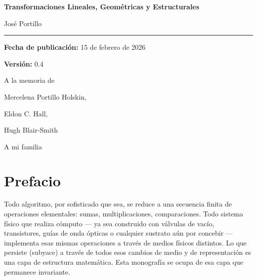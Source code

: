 \documentclass[12pt,openany]{book}
\theoremstyle{definition}
\begin{document}
\pagestyle{plain}

\frontmatter

\begin{titlepage}
\thispagestyle{empty}

\vspace*{2.2cm}

{\Large\bfseries
Transformaciones Lineales, Geométricas y Estructurales\par}
\vspace{0.4cm}

\vspace{1.4cm}
{\Large Jos\'e Portillo\par}

\vspace{1.8cm}
\rule{\textwidth}{0.6pt}
\vspace{0.35cm}

{\small
\textbf{Fecha de publicación:} 15 de febrero de 2026\par
\textbf{Versión:} 0.4\par
}

\vfill

\end{titlepage}


\thispagestyle{empty}
\null\vfill
\begin{center}
A la memoria de\par
Mercelena Portillo Holskin,\par
Eldon C. Hall,\par
Hugh Blair-Smith\par
\vspace{1cm}
A mi familia
\end{center}
\vfill\null
\clearpage

\tableofcontents

\chapter*{Prefacio}

Todo algoritmo, por sofisticado que sea, se reduce a una
secuencia finita de operaciones elementales: sumas, multiplicaciones,
comparaciones.
Todo sistema físico que realiza cómputo --- ya sea construido con válvulas de
vacío, transistores, guías de onda ópticas o cualquier sustrato aún por
concebir --- implementa esas mismas operaciones a través de medios físicos
distintos.
Lo que persiste (subyace) a través de todos esos cambios de medio y de representación es
una capa de estructura matemática.
Esta monografía se ocupa de esa capa que permanece invariante.
\end{document}
